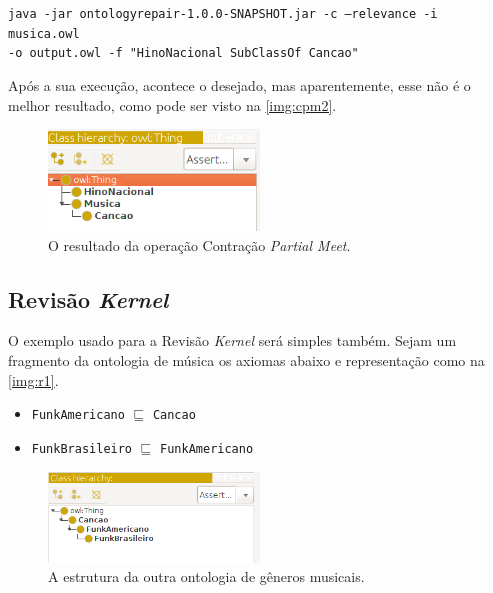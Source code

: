 \begin{small}
	\texttt{java -jar ontologyrepair-1.0.0-SNAPSHOT.jar -c --relevance -i musica.owl \\ -o output.owl -f "HinoNacional SubClassOf Cancao"}
\end{small}

Após a sua execução, acontece o desejado, mas aparentemente, esse não é o melhor resultado, como pode ser visto na \autoref{img:cpm2}.

\begin{figure}[H]
	\centering
	\includegraphics[width=0.5\textwidth]{Capitulos/Implementacao/cpm2.png}
	\caption{O resultado da operação Contração \textit{Partial Meet}.}
	\label{img:cpm2}
\end{figure}

\subsection{Revisão \textit{Kernel}}

O exemplo usado para a Revisão \textit{Kernel} será simples também. Sejam um fragmento da ontologia de música os axiomas abaixo e representação como na \autoref{img:r1}.

\begin{itemize}
	\item \texttt{FunkAmericano} $ \sqsubseteq $ \texttt{Cancao}
	\item \texttt{FunkBrasileiro} $ \sqsubseteq $ \texttt{FunkAmericano}
\end{itemize}

\begin{figure}[H]
	\centering
	\includegraphics[width=0.5\textwidth]{Capitulos/Implementacao/r1.png}
	\caption{A estrutura da outra ontologia de gêneros musicais.}
	\label{img:r1}
\end{figure}

